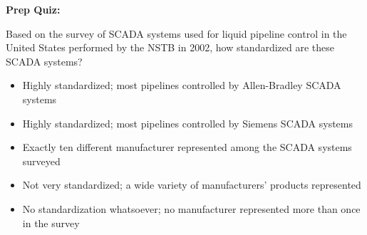 \vfil \eject

\noindent
{\bf Prep Quiz:}

Based on the survey of SCADA systems used for liquid pipeline control in the United States performed by the NSTB in 2002, how standardized are these SCADA systems?

\begin{itemize}
\item{} Highly standardized; most pipelines controlled by Allen-Bradley SCADA systems
\vskip 5pt 
\item{} Highly standardized; most pipelines controlled by Siemens SCADA systems 
\vskip 5pt 
\item{} Exactly ten different manufacturer represented among the SCADA systems surveyed
\vskip 5pt 
\item{} Not very standardized; a wide variety of manufacturers' products represented
\vskip 5pt 
\item{} No standardization whatsoever; no manufacturer represented more than once in the survey
\end{itemize}





